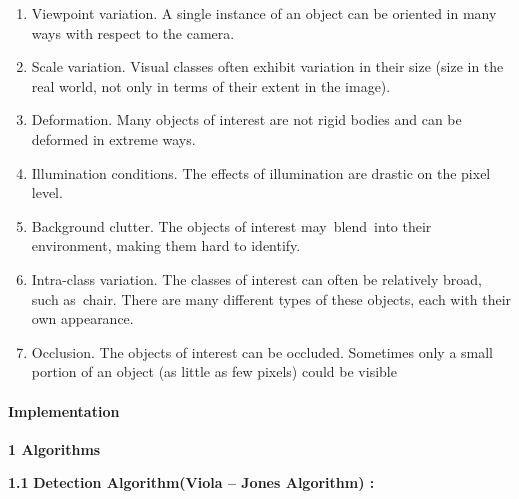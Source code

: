 \documentclass{article} %
\begin{document}
\noindent \textbf{               }

\begin{enumerate}
\item \textbf{ }Viewpoint variation. A single instance of an object can be oriented in many ways with respect to the camera.

\item  Scale variation. Visual classes often exhibit variation in their size (size in the real world, not only in terms of their extent in the image).

\item  Deformation. Many objects of interest are not rigid bodies and can be deformed in extreme ways.

\item  Illumination conditions. The effects of illumination are drastic on the pixel level.

\item  Background clutter. The objects of interest may~blend~into their environment, making them hard to identify.

\item  Intra-class variation. The classes of interest can often be relatively broad, such as~chair. There are many different types of these objects, each with their own appearance.

\item  Occlusion. The objects of interest can be occluded. Sometimes only a small portion of an object (as little as few pixels) could be visible
\end{enumerate}

\noindent 

\noindent 

\noindent 

\noindent 

\noindent 

\noindent 

\noindent 

\noindent 

\noindent 

\noindent 

\noindent 
\paragraph{Implementation}

\noindent \textbf{1 Algorithms}

\noindent     \textbf{1.1} \textbf{ Detection Algorithm(Viola -- Jones Algorithm) :}
\end{document}
